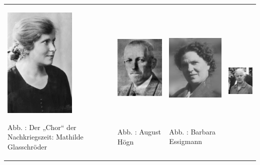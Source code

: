 \begin{flushleft}
\tablefirsthead{}
\tablehead{}
\tabletail{}
\tablelasttail{}
\begin{supertabular}{m{3.5939999cm}m{4.361cm}m{4.123cm}m{3.3769999cm}}

\includegraphics[width=3.413cm,height=5.323cm]{pictures/zulassungsarbeit-img047.jpg}

Abb. : Der „Chor“ der Nachkriegszeit: Mathilde
Glasschröder &

\includegraphics[width=4.18cm,height=5.308cm]{pictures/zulassungsarbeit-img048.jpg}

Abb. : August Högn &

\includegraphics[width=3.942cm,height=5.3cm]{pictures/zulassungsarbeit-img049.jpg}

Abb. : Barbara Essigmann  &

\includegraphics[width=3.194cm,height=5.281cm]{pictures/zulassungsarbeit-img050.jpg}


\end{supertabular}
\end{flushleft}

